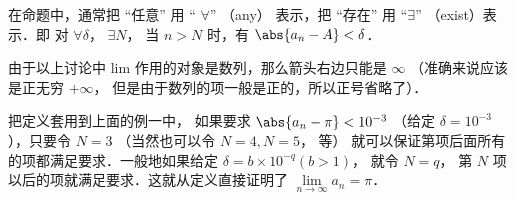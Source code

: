 在命题中，通常把 “任意” 用 “ $\forall$” （any） 表示，把 “存在” 用 “$\exists $” （exist）表示．即
对 $\forall \delta$， $\exists N$， 当 $n>N$ 时，有 $\abs{a_n - A} < \delta$． 

由于以上讨论中 lim 作用的对象是数列，那么箭头右边只能是 $\infty$ （准确来说应该是正无穷 $+\infty$， 但是由于数列的项一般是正的，所以正号省略了）．

把定义套用到上面的例一中， 如果要求 $\abs{a_n - \pi} < 10^{-3}$ （给定 $\delta  = 10^{-3}$），只要令 $N=3$ （当然也可以令 $N=4, N=5$， 等） 就可以保证第项后面所有的项都满足要求．一般地如果给定 $\delta  = b \times 10^{-q}  (b > 1)$， 就令 $N = q$， 第 $N$ 项以后的项就满足要求．这就从定义直接证明了 $\lim\limits_{n \to \infty } a_n = \pi$． 

